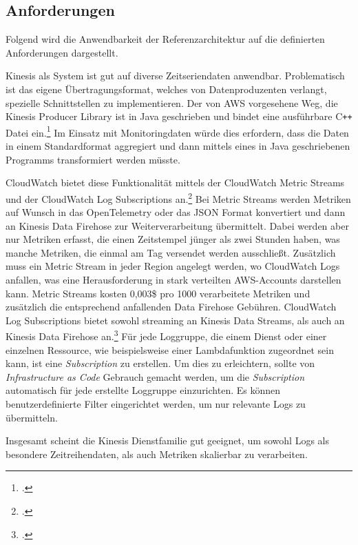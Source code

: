 \subsection{Anforderungen}
Folgend wird die Anwendbarkeit der Referenzarchitektur auf die definierten Anforderungen dargestellt.

Kinesis als System ist gut auf diverse Zeitseriendaten anwendbar. Problematisch ist das eigene Übertragungsformat, welches von Datenproduzenten verlangt, spezielle Schnittstellen zu implementieren. Der von \ac{AWS} vorgesehene Weg, die Kinesis Producer Library ist in Java geschrieben und bindet eine ausführbare C\texttt{++} Datei ein.\footcite[Vgl.][]{AmazonWebServicesInc..o.J.bg} Im Einsatz mit Monitoringdaten würde dies erfordern, dass die Daten in einem Standardformat aggregiert und dann mittels eines in Java geschriebenen Programms transformiert werden müsste. 

CloudWatch bietet diese Funktionalität mittels der CloudWatch Metric Streams und der CloudWatch Log Subscriptions an.\footcite[Vgl. auch im Folgenden][]{Barr.2021} Bei Metric Streams werden Metriken auf Wunsch in das OpenTelemetry oder das \ac{JSON} Format konvertiert und dann an Kinesis Data Firehose zur Weiterverarbeitung übermittelt. Dabei werden aber nur Metriken erfasst, die einen Zeitstempel jünger als zwei Stunden haben, was manche Metriken, die einmal am Tag versendet werden ausschließt. Zusätzlich muss ein Metric Stream in jeder Region angelegt werden, wo CloudWatch Logs anfallen, was eine Herausforderung in stark verteilten \ac{AWS}-Accounts darstellen kann. Metric Streams kosten 0,003\$ pro 1000 verarbeitete Metriken und zusätzlich die entsprechend anfallenden Data Firehose Gebühren. CloudWatch Log Subscriptions bietet sowohl streaming an Kinesis Data Streams, als auch an Kinesis Data Firehose an.\footcite[Vgl. auch im Folgenden][]{AmazonWebServicesInc..o.J.bk} Für jede Loggruppe, die einem Dienst oder einer einzelnen Ressource, wie beispielsweise einer Lambdafunktion zugeordnet sein kann, ist eine \textit{Subscription} zu erstellen. Um dies zu erleichtern, sollte von \textit{Infrastructure as Code} Gebrauch gemacht werden, um die \textit{Subscription} automatisch für jede erstellte Loggruppe einzurichten. Es können benutzerdefinierte Filter eingerichtet werden, um nur relevante Logs zu übermitteln.

Insgesamt scheint die Kinesis Dienstfamilie gut geeignet, um sowohl Logs als besondere Zeitreihendaten, als auch Metriken skalierbar zu verarbeiten.

